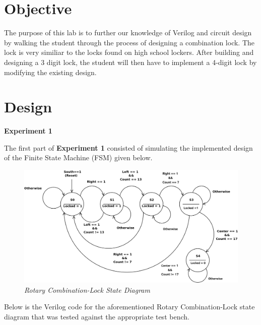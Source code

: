 \documentclass[a4paper,12pt]{article}
\begin{document}
\section*{Objective}

  \hspace{15pt}The purpose of this lab is to further our knowledge of Verilog and circuit design by walking the student through the process of designing a combination lock. The lock is very similiar to the locks found on high school lockers. After building and designing a 3 digit lock, the student will then have to implement a 4-digit lock by modifying the existing design.

\section*{Design}
\textbf{Experiment 1}

The first part of \textbf{Experiment 1} consisted of simulating the implemented design of the Finite State Machine (FSM) given below.

\begin{figure}[h]
  \begin{center}
    \includegraphics[scale=.21]{AutomaEdit.png}
    \caption{\textit{Rotary Combination-Lock State Diagram}}
  \end{center}
\end{figure}

Below is the Verilog code for the aforementioned Rotary Combination-Lock state diagram that was tested against the appropriate test bench.
\end{document}
